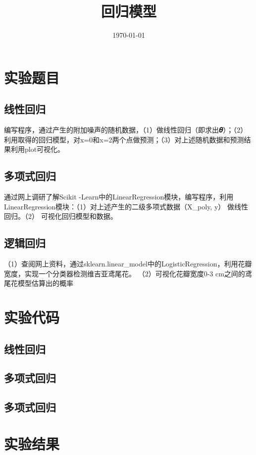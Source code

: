 \documentclass{../source/Experiment}
\title{回归模型}
\date{\today}
\begin{document}
    \makecover
    \section{实验题目}
        \subsection{线性回归}
        编写程序，通过产生的附加噪声的随机数据，（1）做线性回归（即求出𝜽）；（2）利用取得的回归模型，对x=0和x=2两个点做预测；（3）对上述随机数据和预测结果利用plot可视化。

        \subsection{多项式回归}
       
        通过网上调研了解Scikit -Learn中的LinearRegression模块，编写程序，利用LinearRegression模块：（1）对上述产生的二级多项式数据（X\_poly, y） 做线性回归。（2） 可视化回归模型和数据。


        \subsection{逻辑回归}

        （1）查阅网上资料，通过sklearn.linear\_model中的LogisticRegression，利用花瓣宽度，实现一个分类器检测维吉亚鸢尾花。
        （2）可视化花瓣宽度0-3 cm之间的鸢尾花模型估算出的概率
    
    \section{实验代码}
    \subsection{线性回归}
    
    
    \subsection{多项式回归}
    
    \subsection{多项式回归}

    \section{实验结果}
    
\end{document}
